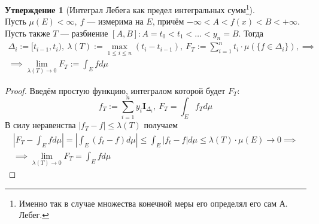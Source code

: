 \documentclass[11pt,a4paper]{report}
\theoremstyle{definition}
\theoremstyle{definition}
\newtheorem{preposition}{Утверждение}[section]
\theoremstyle{definition}
\begin{document}
		\begin{preposition}[Интеграл Лебега как предел интегральных сумм\footnote{Именно так в случае множества конечной меры его определял его сам А. Лебег.}]$  $\\
			Пусть $ \mu(E) < \infty,\ f $ — измерима на $ E $, причём $ -\infty < A < f(x) < B < +\infty $. Пусть также $ T $ — разбиение $ [A, B]: A = t_{0} < t_{1} < \dots < y_{n} = B $. Тогда
			\begin{gather*} 
				\Delta_{i} := [t_{i-1}, t_{i}),\ \lambda(T) := \max\limits_{1 \le i \le n} {(t_{i} - t_{i-1})},\ F_{T} := \sum\limits_{i=1}^{n} t_{i} \cdot \mu( \{f \in \Delta_{i} \} ), \implies\\\implies \lim\limits_{\lambda(T) \to 0} F_{T} := \int_{E} f d\mu 
			\end{gather*}
		\end{preposition}
		\begin{proof}
			Введём простую функцию, интегралом которой будет $ F_{T} $: 
			\[ 
				f_{T}  := \sum\limits_{i=1}^{n} y_{i} \mathbf{I}_{\Delta_{i}},\ F_{T} = \int_{E} f_{T} d\mu 
			\] 
			В силу неравенства $ |f_{T} - f| \le \lambda(T) $ получаем 
			\begin{gather*}
				\left | F_{T} - \int_{E} f d\mu \right | = \left | \int_{E} (f_{t} - f) d\mu \right | \le \int_{E} |f_{t} - f| d\mu \le \lambda(T) \cdot \mu(E) \to 0 \implies\\\implies \lim\limits_{\lambda(T) \to 0} F_{T} = \int_{E} f d\mu
			\end{gather*}
		\end{proof}
\end{document}
